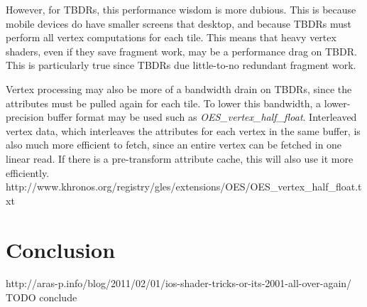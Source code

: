 However, for TBDRs, this performance wisdom is more dubious.  This is because mobile devices do have smaller screens that desktop, and because TBDRs must perform all vertex computations for each tile.  This means that heavy vertex shaders, even if they save fragment work, may be a performance drag on TBDR.  This is particularly true since TBDRs due little-to-no redundant fragment work.

Vertex processing may also be more of a bandwidth drain on TBDRs, since the attributes must be pulled again for each tile.  To lower this bandwidth, a lower-precision buffer format may be used such as \textit{OES_vertex_half_float}.  Interleaved vertex data, which interleaves the attributes for each vertex in the same buffer, is also much more efficient to fetch, since an entire vertex can be fetched in one linear read.  If there is a pre-transform attribute cache, this will also use it more efficiently.  
http://www.khronos.org/registry/gles/extensions/OES/OES_vertex_half_float.txt
\section{Conclusion}
http://aras-p.info/blog/2011/02/01/ios-shader-tricks-or-its-2001-all-over-again/
TODO conclude















